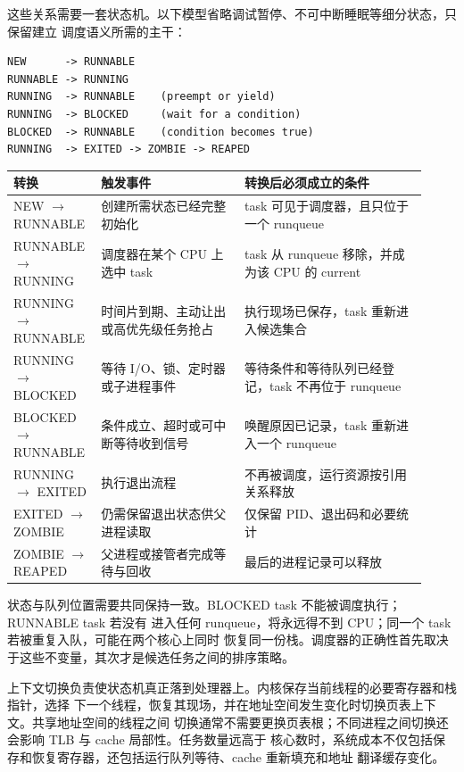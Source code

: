 这些关系需要一套状态机。以下模型省略调试暂停、不可中断睡眠等细分状态，只保留建立
调度语义所需的主干：

\begin{lstlisting}
NEW      -> RUNNABLE
RUNNABLE -> RUNNING
RUNNING  -> RUNNABLE    (preempt or yield)
RUNNING  -> BLOCKED     (wait for a condition)
BLOCKED  -> RUNNABLE    (condition becomes true)
RUNNING  -> EXITED -> ZOMBIE -> REAPED
\end{lstlisting}

\begin{longtable}{|L{0.17\linewidth}|L{0.33\linewidth}|L{0.42\linewidth}|}
\toprule
转换 & 触发事件 & 转换后必须成立的条件 \\
\midrule
NEW $\rightarrow$ RUNNABLE & 创建所需状态已经完整初始化 & task 可见于调度器，且只位于一个 runqueue \\\tablerowrule
RUNNABLE $\rightarrow$ RUNNING & 调度器在某个 CPU 上选中 task & task 从 runqueue 移除，并成为该 CPU 的 current \\\tablerowrule
RUNNING $\rightarrow$ RUNNABLE & 时间片到期、主动让出或高优先级任务抢占 & 执行现场已保存，task 重新进入候选集合 \\\tablerowrule
RUNNING $\rightarrow$ BLOCKED & 等待 I/O、锁、定时器或子进程事件 & 等待条件和等待队列已经登记，task 不再位于 runqueue \\\tablerowrule
BLOCKED $\rightarrow$ RUNNABLE & 条件成立、超时或可中断等待收到信号 & 唤醒原因已记录，task 重新进入一个 runqueue \\\tablerowrule
RUNNING $\rightarrow$ EXITED & 执行退出流程 & 不再被调度，运行资源按引用关系释放 \\\tablerowrule
EXITED $\rightarrow$ ZOMBIE & 仍需保留退出状态供父进程读取 & 仅保留 PID、退出码和必要统计 \\\tablerowrule
ZOMBIE $\rightarrow$ REAPED & 父进程或接管者完成等待与回收 & 最后的进程记录可以释放 \\
\bottomrule
\end{longtable}

状态与队列位置需要共同保持一致。BLOCKED task 不能被调度执行；RUNNABLE task 若没有
进入任何 runqueue，将永远得不到 CPU；同一个 task 若被重复入队，可能在两个核心上同时
恢复同一份栈。调度器的正确性首先取决于这些不变量，其次才是候选任务之间的排序策略。

上下文切换负责使状态机真正落到处理器上。内核保存当前线程的必要寄存器和栈指针，选择
下一个线程，恢复其现场，并在地址空间发生变化时切换页表上下文。共享地址空间的线程之间
切换通常不需要更换页表根；不同进程之间切换还会影响 TLB 与 cache 局部性。任务数量远高于
核心数时，系统成本不仅包括保存和恢复寄存器，还包括运行队列等待、cache 重新填充和地址
翻译缓存变化。

